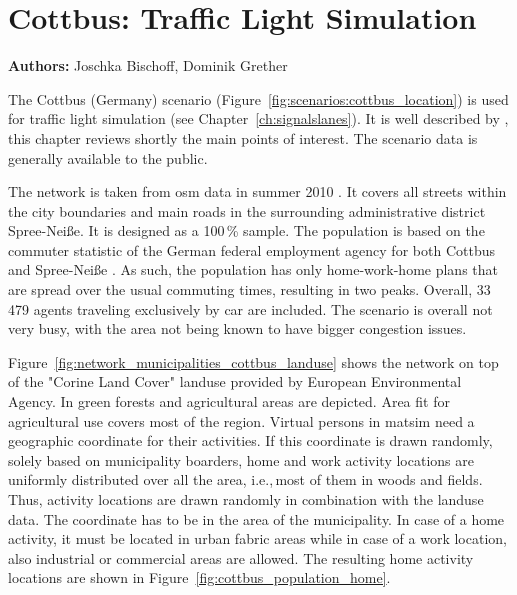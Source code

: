 \section{Cottbus: Traffic Light Simulation}
\label{ch:scenarios:cottbus}
\hfill \textbf{Authors:} Joschka Bischoff, Dominik Grether

The Cottbus (Germany) scenario (Figure~\ref{fig:scenarios:cottbus_location}) is used for traffic light simulation (see Chapter~\ref{ch:signalslanes}). 
It is well described by \citet[][pp.~87]{Grether_PhDThesis_2014}, this chapter reviews shortly the main points of interest. 
The scenario data is generally available to the public.

The network is taken from \gls{osm} data in summer 2010 \citep{Bischoff2010BaSylvia}. 
It covers all streets within the city boundaries and main roads in the surrounding administrative district Spree-Neiße. 
It is designed as a 100\,\% sample. 
The population is based on the commuter statistic of the German federal employment agency for both Cottbus and Spree-Neiße \citep{WiethoelterBogaiCarstensen2010IABPendlerberichtBB}. 
As such, the population has only home-work-home plans that are spread over the usual commuting times, resulting in two peaks. 
Overall, 33\,479 agents traveling exclusively by car are included. 
The scenario is overall not very busy, with the area not being known to have bigger congestion issues.

Figure~\ref{fig:network_municipalities_cottbus_landuse} shows the network on top of the 
"Corine Land Cover" landuse \citep{CorineLandCover2006Data} provided by European Environmental Agency. 
In green forests and agricultural areas are depicted. 
Area fit for agricultural use covers most of the region.  
Virtual persons in \gls{matsim} need a geographic coordinate for their activities. 
If this coordinate is drawn randomly, solely based on municipality boarders, home and work activity locations are uniformly distributed over all the area, i.e.,\,most of them in woods and fields. 
Thus, activity locations are drawn randomly in combination with the landuse data. 
The coordinate has to be in the area of the municipality.  
In case of a home activity, it must be located in urban fabric areas while in case of a work location, also industrial or commercial areas are allowed. 
The resulting home activity locations are shown in Figure~\ref{fig:cottbus_population_home}. 

